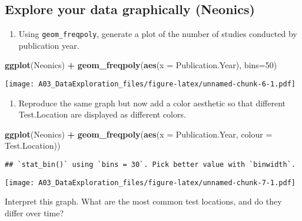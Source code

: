 \documentclass[]{article}
\newenvironment{Shaded}{\begin{snugshade}}{\end{snugshade}}
\newcommand{\DataTypeTok}[1]{\textcolor[rgb]{0.13,0.29,0.53}{#1}}
\newcommand{\DecValTok}[1]{\textcolor[rgb]{0.00,0.00,0.81}{#1}}
\newcommand{\KeywordTok}[1]{\textcolor[rgb]{0.13,0.29,0.53}{\textbf{#1}}}
\newcommand{\NormalTok}[1]{#1}
\newcommand{\OperatorTok}[1]{\textcolor[rgb]{0.81,0.36,0.00}{\textbf{#1}}}
\newcommand{\StringTok}[1]{\textcolor[rgb]{0.31,0.60,0.02}{#1}}
\providecommand{\tightlist}{%
  \setlength{\itemsep}{0pt}\setlength{\parskip}{0pt}}
\begin{document}
\hypertarget{explore-your-data-graphically-neonics}{%
\subsection{Explore your data graphically
(Neonics)}\label{explore-your-data-graphically-neonics}}

\begin{enumerate}
\def\labelenumi{\arabic{enumi}.}
\setcounter{enumi}{8}
\tightlist
\item
  Using \texttt{geom\_freqpoly}, generate a plot of the number of
  studies conducted by publication year.
\end{enumerate}

\begin{Shaded}
\begin{Highlighting}[]
\KeywordTok{ggplot}\NormalTok{(Neonics) }\OperatorTok{+}
\StringTok{  }\KeywordTok{geom_freqpoly}\NormalTok{(}\KeywordTok{aes}\NormalTok{(}\DataTypeTok{x =}\NormalTok{ Publication.Year), }\DataTypeTok{bins=}\DecValTok{50}\NormalTok{)}
\end{Highlighting}
\end{Shaded}

\texttt{[image: A03\_DataExploration\_files/figure-latex/unnamed-chunk-6-1.pdf]}

\begin{enumerate}
\def\labelenumi{\arabic{enumi}.}
\setcounter{enumi}{9}
\tightlist
\item
  Reproduce the same graph but now add a color aesthetic so that
  different Test.Location are displayed as different colors.
\end{enumerate}

\begin{Shaded}
\begin{Highlighting}[]
\KeywordTok{ggplot}\NormalTok{(Neonics) }\OperatorTok{+}
\StringTok{  }\KeywordTok{geom_freqpoly}\NormalTok{(}\KeywordTok{aes}\NormalTok{(}\DataTypeTok{x =}\NormalTok{ Publication.Year, }\DataTypeTok{colour =}\NormalTok{ Test.Location))}
\end{Highlighting}
\end{Shaded}

\begin{verbatim}
## `stat_bin()` using `bins = 30`. Pick better value with `binwidth`.
\end{verbatim}

\texttt{[image: A03\_DataExploration\_files/figure-latex/unnamed-chunk-7-1.pdf]}

Interpret this graph. What are the most common test locations, and do
they differ over time?
\end{document}
